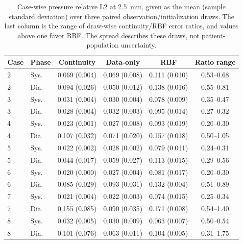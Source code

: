 \begin{table}[htbp]
\centering
\small
\caption{Case-wise pressure relative L2 at 2.5~mm, given as the mean (sample standard deviation) over three paired observation/initialization draws. The last column is the range of draw-wise continuity/RBF error ratios, and values above one favor RBF. The spread describes these draws, not patient-population uncertainty.}
\label{tab:case_pressure}
\begin{tabular}{llcccc}
\toprule
Case & Phase & Continuity & Data-only & RBF & Ratio range \\
\midrule
2 & Sys. & 0.069 (0.004) & 0.069 (0.008) & 0.111 (0.010) & 0.53--0.68 \\
2 & Dia. & 0.094 (0.026) & 0.050 (0.012) & 0.138 (0.016) & 0.55--0.81 \\
3 & Sys. & 0.031 (0.004) & 0.030 (0.004) & 0.078 (0.009) & 0.35--0.47 \\
3 & Dia. & 0.028 (0.004) & 0.032 (0.003) & 0.095 (0.014) & 0.27--0.32 \\
4 & Sys. & 0.023 (0.001) & 0.027 (0.008) & 0.093 (0.019) & 0.20--0.30 \\
4 & Dia. & 0.107 (0.032) & 0.071 (0.020) & 0.157 (0.018) & 0.50--1.05 \\
5 & Sys. & 0.022 (0.002) & 0.028 (0.002) & 0.079 (0.011) & 0.24--0.31 \\
5 & Dia. & 0.044 (0.017) & 0.059 (0.027) & 0.113 (0.015) & 0.29--0.56 \\
6 & Sys. & 0.020 (0.000) & 0.027 (0.004) & 0.081 (0.017) & 0.20--0.30 \\
6 & Dia. & 0.085 (0.029) & 0.093 (0.031) & 0.132 (0.004) & 0.51--0.89 \\
7 & Sys. & 0.021 (0.004) & 0.022 (0.003) & 0.074 (0.015) & 0.25--0.34 \\
7 & Dia. & 0.155 (0.085) & 0.090 (0.035) & 0.171 (0.008) & 0.54--1.40 \\
8 & Sys. & 0.032 (0.005) & 0.030 (0.009) & 0.063 (0.007) & 0.50--0.54 \\
8 & Dia. & 0.101 (0.076) & 0.063 (0.011) & 0.104 (0.005) & 0.31--1.75 \\
\bottomrule
\end{tabular}
\end{table}
